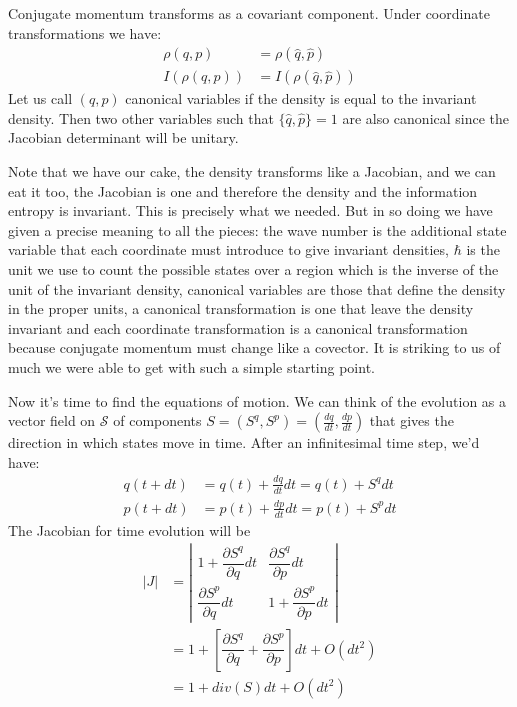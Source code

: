 \documentclass[11pt]{article}
\begin{document}
Conjugate momentum transforms as a covariant component. Under coordinate transformations we have:
\begin{equation}
\label{density_invariance}
\begin{aligned}
\rho(q,p) &= \rho(\hat{q}, \hat{p}) \\
I(\rho(q,p)) &= I(\rho(\hat{q},\hat{p}))
\end{aligned}
\end{equation}
Let us call $(q,p)$ canonical variables if the density is equal to the invariant density. Then two other variables such that $\{\hat{q}, \hat{p}\}=1$ are also canonical since the Jacobian determinant will be unitary.

Note that we have our cake, the density transforms like a Jacobian, and we can eat it too, the Jacobian is one and therefore the density and the information entropy is invariant. This is precisely what we needed. But in so doing we have given a precise meaning to all the pieces: the wave number is the additional state variable that each coordinate must introduce to give invariant densities, $\hbar$ is the unit we use to count the possible states over a region which is the inverse of the unit of the invariant density, canonical variables are those that define the density in the proper units, a canonical transformation is one that leave the density invariant and each coordinate transformation is a canonical transformation because conjugate momentum must change like a covector. It is striking to us of much we were able to get with such a simple starting point.

Now it's time to find the equations of motion. We can think of the evolution as a vector field on $\mathcal{S}$ of components $S = (S^q, S^p) = (\frac{dq}{dt}, \frac{dp}{dt})$ that gives the direction in which states move in time. After an infinitesimal time step, we'd have:
\begin{equation}
\begin{aligned}
q(t+dt) &= q(t) + \frac{dq}{dt} dt = q(t) + S^q dt \\
p(t+dt) &= p(t) + \frac{dp}{dt} dt = p(t) + S^p dt
\end{aligned}
\end{equation}
The Jacobian for time evolution will be
\begin{equation}
\label{Jacobian_evolution}
\begin{aligned}
|J| &= \left| \begin{matrix}
1 + \dfrac{\partial S^q}{\partial q}dt & \dfrac{\partial S^q}{\partial p} dt \\[2.2ex]
\dfrac{\partial S^p}{\partial q}  dt & 1 + \dfrac{\partial S^p}{\partial p} dt \end{matrix} \right| \\
&= 1 + \left[ \dfrac{\partial S^q}{\partial q} + \dfrac{\partial S^p}{\partial p} \right]dt + O(dt^2)\\
&= 1 + div(S)dt + O(dt^2)\\
\end{aligned}
\end{equation}
\end{document}
